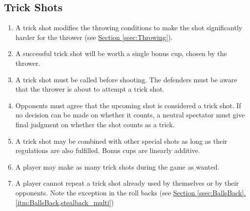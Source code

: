 	\subsection{Trick Shots}\label{ssec:TrickShots}
        \begin{enumerate}[label=(\roman*), ref=\roman*]
            \item \label{itm:trickShots,deff} A trick shot modifies the throwing conditions to make the shot significantly harder for the thrower
                (see \hyperref[ssec:Throwing]{Section \ref*{ssec:Throwing}}).
            \item \label{itm:TrickShots,numofcups} A successful trick shot will be worth a single bonus cup, chosen by the thrower.
            \item \label{itm:TrickShots,calling} A trick shot must be called before shooting.
                The defenders must be aware that the thrower is about to attempt a trick shot.
            \item \label{itm:TrickShot,agree} Opponents must agree that the upcoming shot is considered a trick shot.
                If no decision can be made on whether it counts, a neutral spectator must give final judgment on whether the shot counts as a trick.
            \item \label{itm:TrickShot,combo} A trick shot may be combined with other special shots as long as their regulations are also fulfilled.
                Bonus cups are linearly additive. 
            \item \label{itm:TrickShot,number} A player may make as many trick shots during the game as wanted.
            \item \label{itm:TrickShot,repeat} A player cannot repeat a trick shot already used by themselves or by their opponents.
                Note the exception in the roll backs (see \hyperref[itm:BallsBack,stealback_multi]{Section \ref*{ssec:BallsBack}.\ref*{itm:BallsBack,stealback_multi}})
        \end{enumerate}
